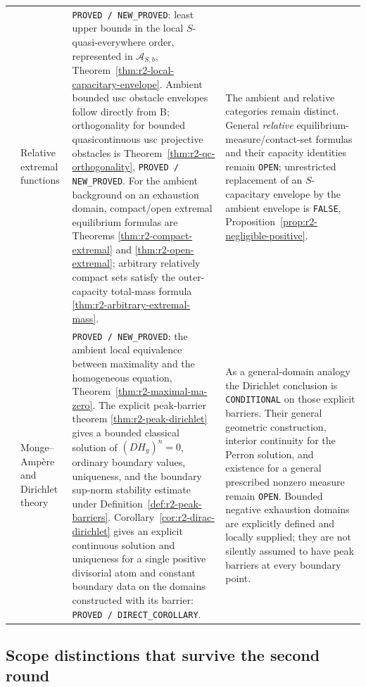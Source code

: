 \documentclass[11pt,a4paper]{article}
\numberwithin{equation}{section}
\theoremstyle{definition}
\theoremstyle{remark}
\begin{document}
\begin{longtable}{@{}>{\raggedright\arraybackslash}p{}>{\raggedright\arraybackslash}p{}>{\raggedright\arraybackslash}p{}>{\raggedright\arraybackslash}p{}@{}}
10 & Relative extremal functions &
\texttt{PROVED / NEW\_PROVED}: least upper bounds in the local
$S$-quasi-everywhere order, represented in $\mathcal A_{S,b}$,
Theorem~\ref{thm:r2-local-capacitary-envelope}.
Ambient bounded usc obstacle envelopes follow directly from B;
orthogonality for bounded quasicontinuous usc projective obstacles
is Theorem~\ref{thm:r2-qc-orthogonality},
\texttt{PROVED / NEW\_PROVED}.
For the ambient background on an exhaustion domain, compact/open
extremal equilibrium formulas are Theorems
\ref{thm:r2-compact-extremal} and \ref{thm:r2-open-extremal};
arbitrary relatively compact sets satisfy the outer-capacity
total-mass formula \ref{thm:r2-arbitrary-extremal-mass}. &
The ambient and relative categories remain distinct. General
\emph{relative} equilibrium-measure/contact-set formulas and their
capacity identities remain \texttt{OPEN}; unrestricted replacement
of an $S$-capacitary envelope by the ambient envelope is \texttt{FALSE},
Proposition~\ref{prop:r2-negligible-positive}.\\[5pt]

11 & Monge--Amp\`ere and Dirichlet theory &
\texttt{PROVED / NEW\_PROVED}: the ambient local equivalence between
maximality and the homogeneous equation,
Theorem~\ref{thm:r2-maximal-ma-zero}.
The explicit peak-barrier theorem
\ref{thm:r2-peak-dirichlet} gives a bounded classical solution of
$(DH_g)^n=0$, ordinary boundary values, uniqueness, and the boundary
sup-norm stability estimate under
Definition~\ref{def:r2-peak-barriers}.
Corollary~\ref{cor:r2-dirac-dirichlet} gives an explicit continuous
solution and uniqueness for a single positive divisorial atom and
constant boundary data on the domains constructed with its barrier:
\texttt{PROVED / DIRECT\_COROLLARY}. &
As a general-domain analogy the Dirichlet conclusion is
\texttt{CONDITIONAL} on those explicit barriers. Their general
geometric construction, interior continuity for the Perron solution,
and existence for a general prescribed nonzero measure remain
\texttt{OPEN}. Bounded negative exhaustion domains are explicitly
defined and locally supplied; they are not silently assumed to have
peak barriers at every boundary point.\\[3pt]
\hline
\end{longtable}

\subsection{Scope distinctions that survive the second round}
\end{document}

